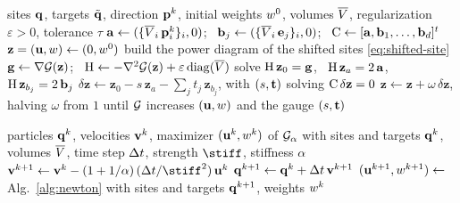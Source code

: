 \documentclass[main.tex]{subfiles}
\begin{document}
\begin{algorithm}[h]
  \caption{Bordered Newton solve of \eqref{eq:flow-line-constraint} (Appendix~\ref{sec:appendix-bordered}).}
  \label{alg:flow-constrained-newton}
  \begin{algorithmic}[1]
    \Require sites $\mathbf{q}$, targets $\tilde{\mathbf{q}}$, direction $\mathbf{p}^k$, initial weights $w^0$, volumes $\overline{V}$, regularization $\varepsilon \!>\! 0$, tolerance $\tau$
    \State $\mathbf{a} \gets (\{\overline{V}_i\,\mathbf{p}^k_i\}_i, 0)$; \ $\mathbf{b}_j \gets (\{\overline{V}_i\,\mathbf{e}_j\}_i, 0)$; \ $\mathrm{C} \gets [\mathbf{a}, \mathbf{b}_1, \dots, \mathbf{b}_d]^{t}$ 
    \State $\mathbf{z} = (\mathbf{u}, w) \gets (0, w^0)$
    \Repeat
      \State build the power diagram of the shifted sites \eqref{eq:shifted-site}
      \State $\mathbf{g} \gets \nabla\mathcal{G}(\mathbf{z})$; \ $\mathrm{H} \gets -\nabla^2\mathcal{G}(\mathbf{z}) + \varepsilon\,\mathrm{diag}(\overline{V})$ \Comment{\eqref{eq:appendix-bordered-matrix}}
      \State solve $\mathrm{H}\,\mathbf{z}_0 = \mathbf{g}$, \ $\mathrm{H}\,\mathbf{z}_a = 2\,\mathbf{a}$, \ $\mathrm{H}\,\mathbf{z}_{b_j} = 2\,\mathbf{b}_j$ 
      \State $\delta\mathbf{z} \gets \mathbf{z}_0 - s\,\mathbf{z}_a - \sum_j t_j\,\mathbf{z}_{b_j}$, with $(s, \mathbf{t})$ solving $\mathrm{C}\,\delta\mathbf{z} = 0$ 
      \State $\mathbf{z} \gets \mathbf{z} + \omega\,\delta\mathbf{z}$, halving $\omega$ from $1$ until $\mathcal{G}$ increases
    \State \Return $(\mathbf{u}, w)$ and the gauge $(s, \mathbf{t})$
  \end{algorithmic}
\end{algorithm}

\begin{algorithm}[h]
  \caption{Time step of the penalty-based integrator (\S\ref{sec:flow-penalty}).}
  \label{alg:flow-penalty}
  \begin{algorithmic}[1]
    \Require particles $\mathbf{q}^k$, velocities $\mathbf{v}^k$, maximizer $(\mathbf{u}^k, w^k)$ of $\mathcal{G}_\alpha$ with sites and targets $\mathbf{q}^k$, volumes $\overline{V}$, time step $\Delta t$, strength $\stiff$, stiffness $\alpha$
    \State $\vel^{k+1} \gets \vel^k - (1 + 1/\alpha)\,(\tstep/\stiff^2)\,\shift^k$ 
    \State $\mathbf{q}^{k+1} \gets \mathbf{q}^k + \Delta t\,\mathbf{v}^{k+1}$ 
    \State $(\mathbf{u}^{k+1}, w^{k+1}) \gets$ Alg.~\ref{alg:newton} with sites and targets $\mathbf{q}^{k+1}$, weights $w^k$
  \end{algorithmic}
\end{algorithm}
\end{document}
